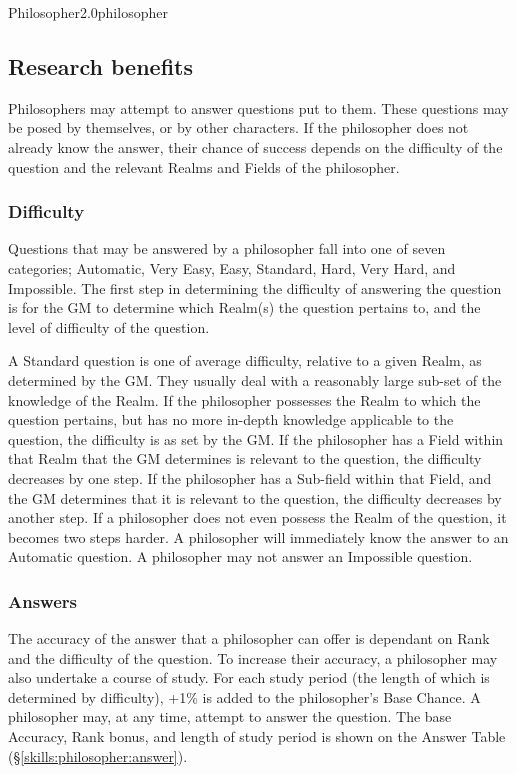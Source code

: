 \begin{skill}{Philosopher}{2.0}{philosopher}
\subsection{Research benefits}

Philosophers may attempt to answer questions put to them. These
questions may be posed by themselves, or by other characters. If the
philosopher does not already know the answer, their chance of success
depends on the difficulty of the question and the relevant Realms and
Fields of the philosopher.

\subsubsection{Difficulty}

Questions that may be answered by a philosopher fall into one of seven
categories; Automatic, Very Easy, Easy, Standard, Hard, Very Hard, and
Impossible.  The first step in determining the difficulty of answering
the question is for the GM to determine which Realm(s) the question
pertains to, and the level of difficulty of the question.

A Standard question is one of average difficulty, relative to a given
Realm, as determined by the GM.  They usually deal with a reasonably
large sub-set of the knowledge of the Realm. If the philosopher
possesses the Realm to which the question pertains, but has no more
in-depth knowledge applicable to the question, the difficulty is as
set by the GM. If the philosopher has a Field within that Realm that
the GM determines is relevant to the question, the difficulty
decreases by one step. If the philosopher has a Sub-field within that
Field, and the GM determines that it is relevant to the question, the
difficulty decreases by another step.  If a philosopher does not even
possess the Realm of the question, it becomes two steps harder. A
philosopher will immediately know the answer to an Automatic
question. A philosopher may not answer an Impossible question.

\subsubsection{Answers}

The accuracy of the answer that a philosopher can offer is dependant
on Rank and the difficulty of the question. To increase their
accuracy, a philosopher may also undertake a course of study. For each
study period (the length of which is determined by difficulty), +1\%
is added to the philosopher's Base Chance. A philosopher may, at any
time, attempt to answer the question. The base Accuracy, Rank bonus,
and length of study period is shown on the Answer Table
(\S\ref{skills:philosopher:answer}).


\end{skill}
